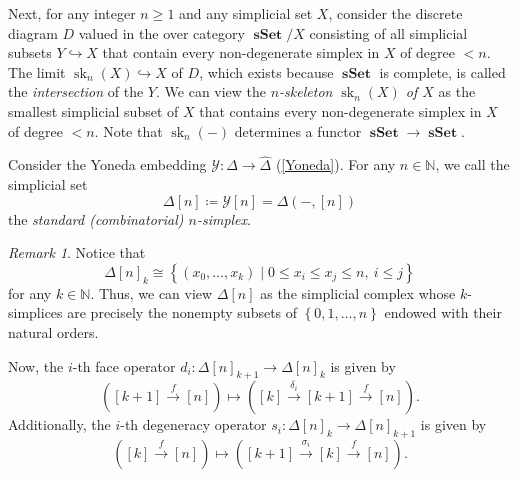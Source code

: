 \documentclass[10pt,letterpaper,cm]{nupset}
\theoremstyle{definition}
\theoremstyle{theorem}
\theoremstyle{remark}
\newtheorem{remark}[definition]{Remark}
\newcommand{\0}{\mathbf{0}}
\newcommand{\1}{\mathbf{1}}
\newcommand{\2}{\mathbf{2}}
\DeclareMathOperator{\op}{op}
\DeclareMathOperator{\sset}{\mathbf{sSet}}
\DeclareMathOperator{\set}{\mathbf{Set}}
\DeclareMathOperator{\trr}{tr}
\DeclareMathOperator{\sk}{sk}
\newcommand{\N}{\mathbb N}
\begin{document}
\medskip

Next, for any integer $n\geq 1$ and any simplicial set $X$, consider the discrete diagram $D$ valued in the over category $\sset/X$ consisting of all simplicial subsets $Y \hookrightarrow X$  that contain every non-degenerate simplex in $X$ of degree $<n$. The limit $\sk_n(X) \hookrightarrow X$ of $D$, which exists because $\sset$ is complete, is called the \textit{intersection} of the $Y$. We can view the \textit{$n$-skeleton $\sk_n(X)$ of $X$} as the smallest simplicial subset of $X$ that contains every non-degenerate simplex in $X$ of degree $<n$. Note that $\sk_n({-})$ determines a functor $\sset \to \sset$.

\begin{comment}
Next, for any integer $n\geq 0$, consider the full subcategory $\varDelta_{\leq n}$ of $\varDelta$ on the set of all ordinals $\left[m\right]$ such that $m\leq n$. We call a functor of the form $\varDelta_{\leq n}^{\op} \to \set$ an \textit{$n$-truncated simplicial set}. The full inclusion $\iota : \varDelta_{\leq n}^{\op} \hookrightarrow \varDelta^{\op}$ induces a \textit{truncation} functor 
\[
\trr_n : \sset \to \left[\varDelta_{\leq n}^{\op}, \set\right], \ \quad K \mapsto K \circ \iota.
\]
This has a left adjoint $\sk_n : \left[\varDelta_{\leq n}^{\op}, \set\right] \to \sset$ called the \textit{$n$-skeleton}, which is given pointwise by the formula 
\[
\sk_n{X}[p] = {\int^{[m]: \varDelta_{\leq n}} \varDelta\left(\left[p\right], \left[m\right]\right)\times  X_m }.
\] (See \cref{coend} below for the meaning of $\int$.)
\end{comment}

\bigskip

Consider the Yoneda embedding $\mathcal{Y}: \varDelta \to \widehat{\varDelta}$ (\cref{Yoneda}). For any $n\in \N$, we call the simplicial set
\[
\Delta[n]\coloneqq \mathcal{Y}{\left[n\right]} =\varDelta\left({-}, \left[n\right]\right)
\] the \textit{standard (combinatorial) $n$-simplex}. 

\begin{remark}\label{std}
Notice that 
\[
\Delta[n]_k \cong \left\{\left(x_0, \ldots, x_k\right) \mid 0\leq x_i \leq x_j \leq n, \ i \leq j\right\}
\]  for any $k \in \N$. Thus, we can view $\Delta[n]$ as the simplicial complex whose $k$-simplices are precisely the nonempty subsets of $\left\{0, 1, \ldots, n\right\}$ endowed with their natural orders.
\end{remark}

Now, the $i$-th face operator $d_i : \Delta[n]_{k+1} \to \Delta[n]_k$ is given by
\[
\left(\left[k+1\right] \stackrel{f}{\longrightarrow}\left[n\right]\right) \mapsto \left(\left[k\right] \stackrel{\delta_i}{\longrightarrow}\left[k+1\right] \stackrel{f}{\longrightarrow}\left[n\right]\right).
\]
Additionally, the $i$-th degeneracy operator $s_i : \Delta[n]_{k} \to \Delta[n]_{k+1}$ is given by 
\[
\left(\left[k\right] \stackrel{f}{\longrightarrow}\left[n\right]\right) \mapsto \left(\left[k+1\right] \stackrel{\sigma_i}{\longrightarrow}\left[k\right] \stackrel{f}{\longrightarrow}\left[n\right]\right).
\] 
\end{document}
